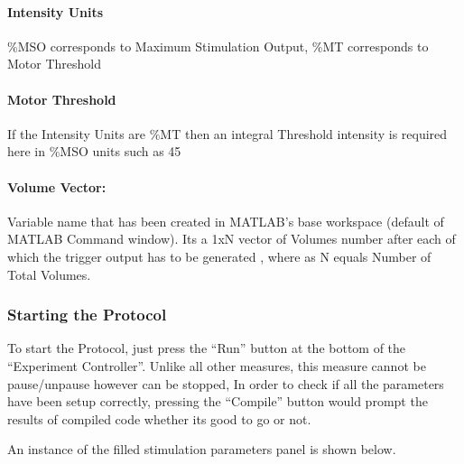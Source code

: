 \documentclass[letterpaper,10pt,english]{sphinxmanual}
\begin{document}
\paragraph{Intensity Units}
\label{\detokenize{14_TMSfMRIMeasurement:intensity-units}}
\sphinxAtStartPar
\%MSO corresponds to Maximum Stimulation Output, \%MT corresponds to Motor Threshold


\paragraph{Motor Threshold}
\label{\detokenize{14_TMSfMRIMeasurement:motor-threshold}}
\sphinxAtStartPar
If the Intensity Units are \%MT then an integral Threshold intensity is required here in \%MSO units such as 45


\paragraph{Volume Vector:}
\label{\detokenize{14_TMSfMRIMeasurement:volume-vector}}
\sphinxAtStartPar
Variable name that has been created in MATLAB’s base workspace (default of MATLAB Command window). Its a 1xN vector of Volumes number after each of which the trigger output has to be generated , where as N equals Number of Total Volumes.


\subsubsection{Starting the Protocol}
\label{\detokenize{14_TMSfMRIMeasurement:starting-the-protocol}}
\sphinxAtStartPar
To start the Protocol, just press the “Run” button at the bottom of the “Experiment Controller”. Unlike all other measures, this measure cannot be pause/unpause however can be stopped, In order to check if all the parameters have been setup correctly, pressing the “Compile” button would prompt the results of compiled code whether its good to go or not.

\sphinxAtStartPar
An instance of the filled stimulation parameters panel is shown below.

\begin{figure}[htbp]
\centering

\noindent{}
\end{figure}
\end{document}
